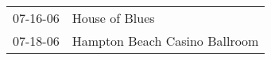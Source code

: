 \begin{supertabular}{p{0.25\columnwidth}p{0.75\columnwidth}}
 07-16-06 &                 House of Blues \\
 07-18-06 &  Hampton Beach Casino Ballroom \\
\end{supertabular}
